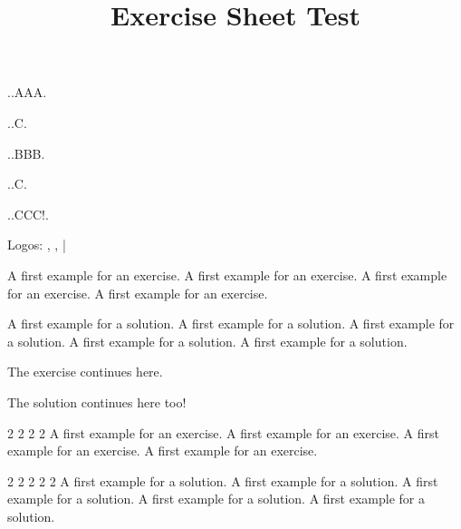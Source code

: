\documentclass[11pt]{article}
\newcommand\mergertest{%
  \par
  .\testaaa.AAA.\par
  .\testaab.C.\par
  .\testbaa.BBB.\par
  .\testbab.C.\par
  .\testbac.CCC!.\par

  Logos: \fbox{\pdflogox}, \fbox{\pdflogoa}, \fbox{\helloB}|\fbox{\helloBetter}
}
\begin{document}
\title{Exercise Sheet Test}
\date{}
\maketitle




\mergertest




\begin{exercise}[subtitle={An example exercise}]
  A first example for an exercise.  A first example for an exercise.  A first
  example for an exercise.  A first example for an exercise.
  \begin{solution}
    A first example for a solution.  A first example for a solution.
    A first example for a solution.  A first example for a solution.
    A first example for a solution.
  \end{solution}
  The exercise continues here.
  \begin{solution}
    The solution continues here too!
  \end{solution}
\end{exercise}

\begin{exercise}[subtitle={Another example exercise}]
  2 2 2 2 A first example for an exercise.   A first example for an exercise.   A first example for an exercise.   A first example for an exercise.
\end{exercise}
\begin{solution}
  2 2 2 2 2 A first example for a solution.  A first example for a solution.
  A first example for a solution.  A first example for a solution.
  A first example for a solution.
\end{solution}
\end{document}
